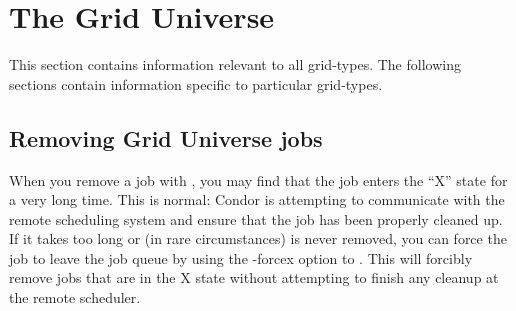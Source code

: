 \section{\label{sec:GridUniverse}The Grid Universe}


This section contains information relevant to all grid-types. The 
following sections contain information specific to particular grid-types.

\subsection{Removing Grid Universe jobs}

When you remove a job with , you may find that the job
enters the ``X'' state for a very long time. This is normal: Condor
is attempting to communicate with the remote scheduling system and
ensure that the job has been properly cleaned up. If it takes too long
or (in rare circumstances) is never removed, you can force the job to
leave the job queue by using the -forcex option to . This
will forcibly remove jobs that are in the X state without attempting
to finish any cleanup at the remote scheduler.



